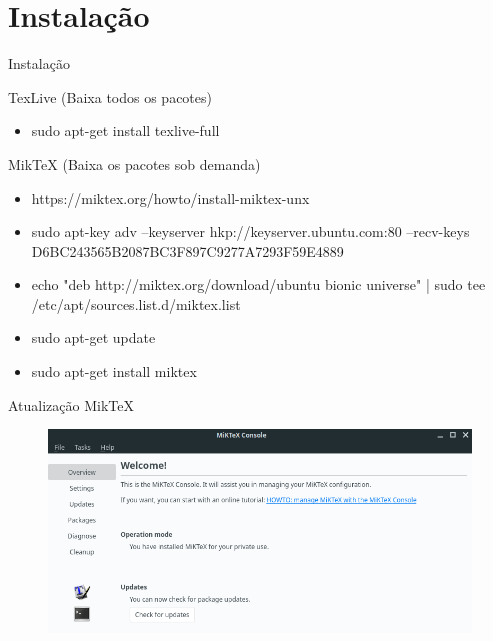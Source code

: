 \documentclass{beamer}
\begin{document}
\section{Instalação}
\begin{frame}{Instalação}

	\begin{block}{TexLive (Baixa todos os pacotes)}
		\begin{itemize}
			\item sudo apt-get install texlive-full 
		\end{itemize}
	\end{block}
	
	\pause
	
	\begin{block}{MikTeX (Baixa os pacotes sob demanda)}
		\begin{itemize}
			\item https://miktex.org/howto/install-miktex-unx
			
			\item sudo apt-key adv --keyserver hkp://keyserver.ubuntu.com:80 --recv-keys D6BC243565B2087BC3F897C9277A7293F59E4889
			
			\item echo "deb http://miktex.org/download/ubuntu bionic universe" | sudo tee /etc/apt/sources.list.d/miktex.list
			
			\item sudo apt-get update
			
			\item sudo apt-get install miktex
		\end{itemize}
	\end{block}
	

\end{frame}


\begin{frame}{Atualização MikTeX}

	\begin{figure}[!htb]
		\centering
		\includegraphics[scale=.38]{miktex.png}
	\end{figure}

\end{frame}
\end{document}
